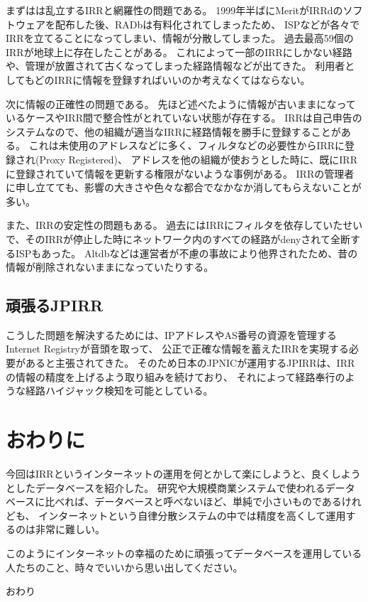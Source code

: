 まずはは乱立するIRRと網羅性の問題である。
1999年半ばにMeritがIRRdのソフトウェアを配布した後、RADbは有料化されてしまったため、
ISPなどが各々でIRRを立てることになってしまい、情報が分散してしまった。
過去最高59個のIRRが地球上に存在したことがある。
これによって一部のIRRにしかない経路や、管理が放置されて古くなってしまった経路情報などが出てきた。
利用者としてもどのIRRに情報を登録すればいいのか考えなくてはならない。

次に情報の正確性の問題である。
先ほど述べたように情報が古いままになっているケースやIRR間で整合性がとれていない状態が存在する。
IRRは自己申告のシステムなので、他の組織が適当なIRRに経路情報を勝手に登録することがある。
これは未使用のアドレスなどに多く、フィルタなどの必要性からIRRに登録され(Proxy Registered)、
アドレスを他の組織が使おうとした時に、既にIRRに登録されていて情報を更新する権限がないような事例がある。
IRRの管理者に申し立てても、影響の大きさや色々な都合でなかなか消してもらえないことが多い。

また、IRRの安定性の問題もある。
過去にはIRRにフィルタを依存していたせいで、そのIRRが停止した時にネットワーク内のすべての経路がdenyされて全断するISPもあった。
Altdbなどは運営者が不慮の事故により他界されたため、昔の情報が削除されないままになっていたりする。

\subsection{頑張るJPIRR}

こうした問題を解決するためには、IPアドレスやAS番号の資源を管理するInternet Registryが音頭を取って、
公正で正確な情報を蓄えたIRRを実現する必要があると主張されてきた。
そのため日本のJPNICが運用するJPIRRは、IRRの情報の精度を上げるよう取り組みを続けており、
それによって経路奉行のような経路ハイジャック検知を可能としている。

\newpage
\section{おわりに}

今回はIRRというインターネットの運用を何とかして楽にしようと、良くしようとしたデータベースを紹介した。
研究や大規模商業システムで使われるデータベースに比べれば、データベースと呼べないほど、単純で小さいものであるけれども、
インターネットという自律分散システムの中では精度を高くして運用するのは非常に難しい。

このようにインターネットの幸福のために頑張ってデータベースを運用している人たちのこと、時々でいいから思い出してください。

\begin{flushright}
おわり
\end{flushright}
